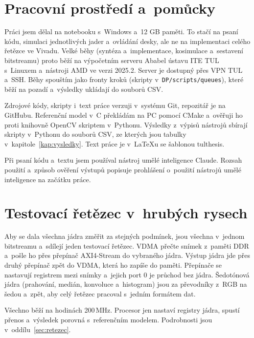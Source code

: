 \section{Pracovní prostředí a~pomůcky}
\label{sec:prostredi}

Práci jsem dělal na notebooku s~Windows a~12 GB paměti. To stačí na psaní kódu, simulaci jednotlivých jader a~ovládání desky, ale ne na implementaci celého řetězce ve Vivadu. Velké běhy (syntéza a~implementace, kosimulace a~sestavení bitstreamu) proto běží na výpočetním serveru Ababel ústavu ITE TUL s~Linuxem a~nástroji AMD ve verzi 2025.2. Server je dostupný přes VPN TUL a~SSH. Běhy spouštím jako fronty kroků (skripty v~\texttt{DP/scripts/queues}), které běží na pozadí a~výsledky ukládají do souborů CSV.

Zdrojové kódy, skripty i~text práce verzuji v~systému Git, repozitář je na GitHubu. Referenční model v~C překládám na PC pomocí CMake a~ověřuji ho proti knihovně OpenCV skriptem v~Pythonu. Výsledky z~výpisů nástrojů sbírají skripty v~Pythonu do souborů CSV, ze kterých jsou tabulky v~kapitole~\ref{kap:vysledky}. Text práce je v~LaTeXu se šablonou tulthesis.

Při psaní kódu a~textu jsem používal nástroj umělé inteligence Claude. Rozsah použití a~způsob ověření výstupů popisuje prohlášení o~použití nástrojů umělé inteligence na začátku práce.

\section{Testovací řetězec v~hrubých rysech}
\label{sec:retezec-prehled}

Aby se dala všechna jádra změřit za stejných podmínek, jsou všechna v~jednom bitstreamu a~sdílejí jeden testovací řetězec. \ac{VDMA} přečte snímek z~paměti DDR a~pošle ho přes přepínač AXI4-Stream do vybraného jádra. Výstup jádra jde přes druhý přepínač zpět do VDMA, která ho zapíše do paměti. Přepínače se nastavují registrem mezi snímky a~jejich port 0 je průchod bez jádra. Šedotónová jádra (prahování, medián, konvoluce a~histogram) jsou za převodníky z~RGB na šedou a~zpět, aby celý řetězec pracoval s~jedním formátem dat.

Všechno běží na hodinách 200\,MHz. Procesor jen nastaví registry jádra, spustí přenos a~výsledek porovná s~referenčním modelem. Podrobnosti jsou v~oddílu~\ref{sec:retezec}.

